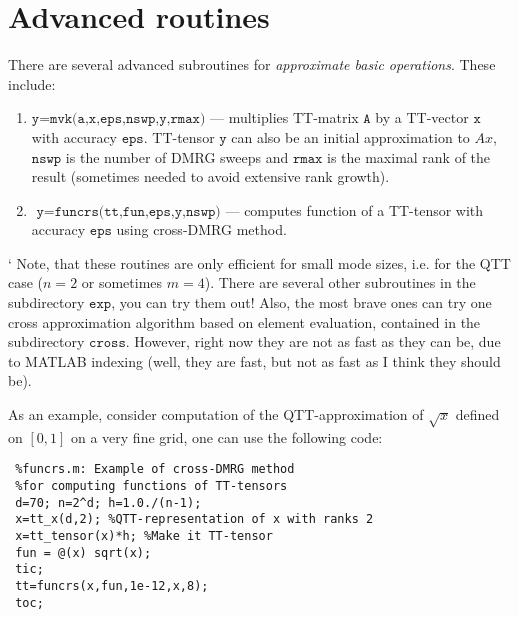 \documentclass[a4paper,12pt,twoside]{article}
\begin{document}
\section{Advanced routines}
There are several advanced subroutines for \emph{approximate basic operations}. These include:
\begin{enumerate}
\item $\texttt{y=mvk(a,x,eps,nswp,y,rmax)}$ --- multiplies TT-matrix $\texttt{A}$ by a TT-vector $\texttt{x}$ 
with accuracy $\texttt{eps}$. TT-tensor $\texttt{y}$ can also be an initial approximation to $Ax$, $\texttt{nswp}$ 
is the number of DMRG sweeps and $\texttt{rmax}$ is the maximal rank of the result (sometimes needed to avoid
extensive rank growth).
\item $\texttt{ y=funcrs(tt,fun,eps,y,nswp)}$ --- computes function of a TT-tensor with accuracy $\texttt{eps}$
using cross-DMRG method.
\end{enumerate}`
Note, that these routines are only efficient for small mode sizes, i.e. for the QTT case ($n=2$ or 
sometimes $m=4$). There are several other subroutines in the subdirectory $\texttt{exp}$, you can try them out!
Also, the most brave ones can try one cross approximation algorithm based on element evaluation, contained
in the subdirectory $\texttt{cross}$. However, right now they are not as fast as they can be, due to 
MATLAB indexing (well, they are fast, but not as fast as I think they should be). 

As an example, consider computation of the QTT-approximation of $\sqrt{x}$ defined on $[0,1]$ on a very fine grid, one can use the 
following code:
\begin{lstlisting}
 %funcrs.m: Example of cross-DMRG method 
 %for computing functions of TT-tensors
 d=70; n=2^d; h=1.0./(n-1); 
 x=tt_x(d,2); %QTT-representation of x with ranks 2
 x=tt_tensor(x)*h; %Make it TT-tensor
 fun = @(x) sqrt(x);
 tic;
 tt=funcrs(x,fun,1e-12,x,8);
 toc;
\end{lstlisting}
\end{document}
